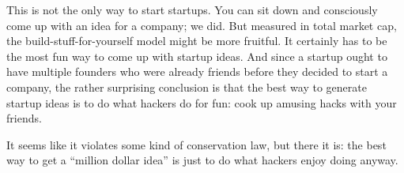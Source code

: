 This is not the only way to start startups. You can sit down and
consciously come up with an idea for a company; we did. But measured in
total market cap, the build-stuff-for-yourself model might be more
fruitful. It certainly has to be the most fun way to come up with
startup ideas. And since a startup ought to have multiple founders who
were already friends before they decided to start a company, the rather
surprising conclusion is that the best way to generate startup ideas is
to do what hackers do for fun: cook up amusing hacks with your friends.

It seems like it violates some kind of conservation law, but there it
is: the best way to get a ``million dollar idea'' is just to do what
hackers enjoy doing anyway.
